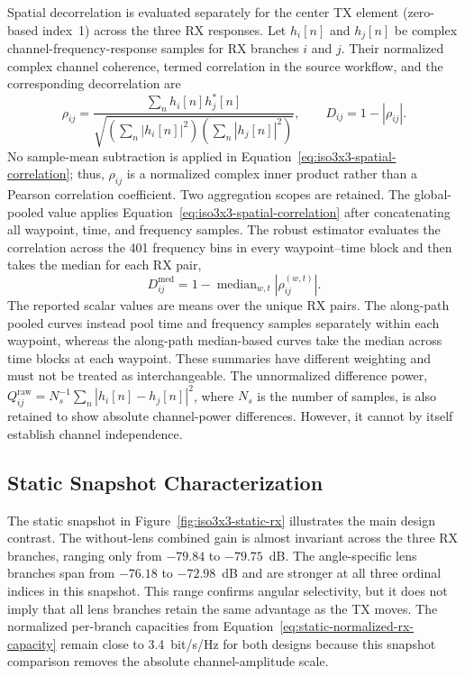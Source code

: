 Spatial decorrelation is evaluated separately for the center TX element (zero-based index~1) across the three RX responses. Let $h_i[n]$ and $h_j[n]$ be complex channel-frequency-response samples for RX branches $i$ and $j$. Their normalized complex channel coherence, termed correlation in the source workflow, and the corresponding decorrelation are
\begin{equation}
    \rho_{ij}=\frac{\sum_n h_i[n]h_j^*[n]}
    {\sqrt{\left(\sum_n|h_i[n]|^2\right)\left(\sum_n|h_j[n]|^2\right)}},
    \qquad D_{ij}=1-|\rho_{ij}|.
    \label{eq:iso3x3-spatial-correlation}
\end{equation}
No sample-mean subtraction is applied in Equation~\ref{eq:iso3x3-spatial-correlation}; thus, $\rho_{ij}$ is a normalized complex inner product rather than a Pearson correlation coefficient. Two aggregation scopes are retained. The global-pooled value applies Equation~\ref{eq:iso3x3-spatial-correlation} after concatenating all waypoint, time, and frequency samples. The robust estimator evaluates the correlation across the 401 frequency bins in every waypoint--time block and then takes the median for each RX pair,
\begin{equation}
    D_{ij}^{\mathrm{med}}=1-\operatorname{median}_{w,t}\!\left|\rho_{ij}^{(w,t)}\right|.
    \label{eq:iso3x3-median-decorrelation}
\end{equation}
The reported scalar values are means over the unique RX pairs. The along-path pooled curves instead pool time and frequency samples separately within each waypoint, whereas the along-path median-based curves take the median across time blocks at each waypoint. These summaries have different weighting and must not be treated as interchangeable. The unnormalized difference power, $Q_{ij}^{\mathrm{raw}}=N_s^{-1}\sum_n|h_i[n]-h_j[n]|^2$, where $N_s$ is the number of samples, is also retained to show absolute channel-power differences. However, it cannot by itself establish channel independence.

\subsection{Static Snapshot Characterization}

The static snapshot in Figure~\ref{fig:iso3x3-static-rx} illustrates the main design contrast. The without-lens combined gain is almost invariant across the three RX branches, ranging only from $-79.84$ to $-79.75$~dB. The angle-specific lens branches span from $-76.18$ to $-72.98$~dB and are stronger at all three ordinal indices in this snapshot. This range confirms angular selectivity, but it does not imply that all lens branches retain the same advantage as the TX moves. The normalized per-branch capacities from Equation~\ref{eq:static-normalized-rx-capacity} remain close to 3.4~bit/s/Hz for both designs because this snapshot comparison removes the absolute channel-amplitude scale.

